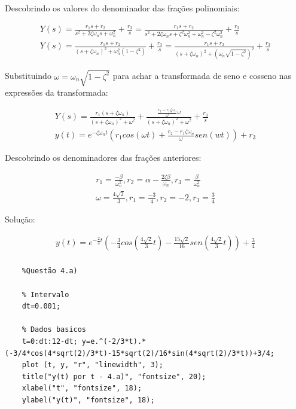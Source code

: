 \documentclass[10pt]{article}
\begin{document}
Descobrindo os valores do denominador das frações polinomiais:

\begin{align*}
    Y(s) = \frac{r_1 s + r_2}{s^2 + 2\zeta \omega_n s + \omega_n^2} + \frac{r_3}{s} = \frac{r_1 s + r_2}{s^2 + 2\zeta \omega_n s + \zeta^2 \omega_n^2 + \omega_n^2 - \zeta^2 \omega_n^2} + \frac{r_3}{s} \\
    Y(s) = \frac{r_1 s + r_2}{(s + \zeta \omega_n)^2 + \omega_n^2 (1 - \zeta^2)} + \frac{r_3}{s} = \frac{r_1 s + r_2}{(s + \zeta \omega_n)^2 + (\omega_n \sqrt{1 - \zeta^2})^2} + \frac{r_3}{s}
\end{align*}

Substituindo $\omega = \omega_n \sqrt{1 - \zeta^2}$ para achar a transformada de seno e cosseno nas expressões da transformada:

\begin{align*}
    Y(s) = \frac{r_1(s + \zeta \omega_n)}{(s + \zeta \omega_n)^2 + \omega^2} + \frac{\frac{r_2 - r_1 \zeta \omega_n}{\omega} \omega}{(s + \zeta \omega_n)^2 + \omega^2} + \frac{r_3}{s} \\
    y(t) = e^{- \zeta \omega_n t}(r_1 cos(\omega t) + \frac{r_2 - r_1 \zeta \omega_n}{\omega}sen(wt)) + r_3
\end{align*}

Descobrindo os denominadores das frações anteriores:

\begin{align*}
    r_1 = \frac{-\beta}{\omega_n^2}, r_2 = \alpha - \frac{2 \zeta \beta}{\omega_n}, r_3 = \frac{\beta}{\omega_n^2} \\
    \omega = \frac{4 \sqrt{2}}{3}, r_1 = \frac{-3}{4}, r_2 = -2, r_3 = \frac{3}{4}
\end{align*}

Solução:

\begin{align*}
    y(t) = e^{-\frac{2}{3}t} \left(-\frac{3}{4}cos\left(\frac{4 \sqrt{2}}{3}t\right) - \frac{15 \sqrt{2}}{16} sen\left(\frac{4 \sqrt{2}}{3}t\right)\right) + \frac{3}{4} \\
\end{align*}

\begin{verbatim}
    %Questão 4.a)

    % Intervalo
    dt=0.001;

    % Dados basicos
    t=0:dt:12-dt; y=e.^(-2/3*t).*(-3/4*cos(4*sqrt(2)/3*t)-15*sqrt(2)/16*sin(4*sqrt(2)/3*t))+3/4;
    plot (t, y, "r", "linewidth", 3);
    title("y(t) por t - 4.a)", "fontsize", 20);
    xlabel("t", "fontsize", 18);
    ylabel("y(t)", "fontsize", 18);
\end{verbatim}
\end{document}
